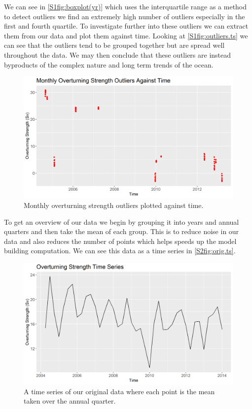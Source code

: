 We can see in \autoref{S1fig:boxplot(yr)} which uses the interquartile range as a method to detect outliers we find an extremely high number of outliers especially in the first and fourth quartile. To investigate further into these outliers we can extract them from our data and plot them against time.
\nline
Looking at \autoref{S1fig:outliers.ts} we can see that the outliers tend to be grouped together but are spread well throughout the data. We may then conclude that these outliers are instead byproducts of the complex nature and long term trends of the ocean.

\begin{figure}[H]
    \centering
    \includegraphics[width=\sOneSize\textwidth]{Sections/DataIntegretity/Plots/outliers.png}
    \caption{Monthly overturning strength outliers plotted against time.}
    \label{S1fig:outliers.ts}
\end{figure}

To get an overview of our data we begin by grouping it into years and annual quarters and then take the mean of each group. This is to reduce noise in our data and also reduces the number of points which helps speeds up the model building computation. We can see this data as a time series in \autoref{S2fig:orig.ts}.

\begin{figure}[H]
    \centering
    \includegraphics[width=\sOneSize\textwidth]{Sections/DataIntegretity/Plots/orig.png}
    \caption{A time series of our original data where each point is the mean taken over the annual quarter.}
    \label{S2fig:orig.ts}
\end{figure}

